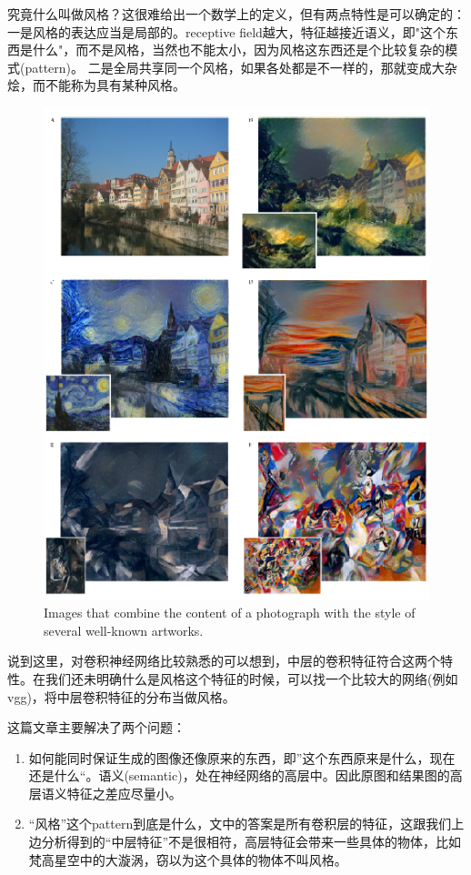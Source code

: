 \documentclass[11pt,fleqn, UTF8]{ctexbook} %
\begin{document}
究竟什么叫做风格？这很难给出一个数学上的定义，但有两点特性是可以确定的：
一是风格的表达应当是局部的。receptive field越大，特征越接近语义，即"这个东西是什么"，而不是风格，当然也不能太小，因为风格这东西还是个比较复杂的模式(pattern)。
二是全局共享同一个风格，如果各处都是不一样的，那就变成大杂烩，而不能称为具有某种风格。
\begin{figure}[t]
 \centering
 \includegraphics{pics/66.png}
 \caption{Images that combine the content of a photograph with the style of several well-known artworks.}
 \label{fig:6.6}
\end{figure}
说到这里，对卷积神经网络比较熟悉的可以想到，中层的卷积特征符合这两个特性。在我们还未明确什么是风格这个特征的时候，可以找一个比较大的网络(例如vgg)，将中层卷积特征的分布当做风格。

这篇文章主要解决了两个问题：
\begin{enumerate}
  \item 如何能同时保证生成的图像还像原来的东西，即”这个东西原来是什么，现在还是什么“。语义(semantic)，处在神经网络的高层中。因此原图和结果图的高层语义特征之差应尽量小。
  \item “风格”这个pattern到底是什么，文中的答案是所有卷积层的特征，这跟我们上边分析得到的“中层特征”不是很相符，高层特征会带来一些具体的物体，比如梵高星空中的大漩涡，窃以为这个具体的物体不叫风格。
\end{enumerate}
\end{document}
